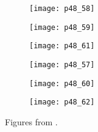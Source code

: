 \begin{figure}[htb]
    \centering %
    \begin{subfigure}{0.25\textwidth}
        \texttt{[image: p48\_58]}
    \end{subfigure}\hfil %
    \begin{subfigure}{0.25\textwidth}
        \texttt{[image: p48\_59]}
    \end{subfigure}\hfil %
    \begin{subfigure}{0.25\textwidth}
        \texttt{[image: p48\_61]}
    \end{subfigure}

    \medskip
    \begin{subfigure}{0.25\textwidth}
        \texttt{[image: p48\_57]}
    \end{subfigure}\hfil %
    \begin{subfigure}{0.25\textwidth}
        \texttt{[image: p48\_60]}
    \end{subfigure}\hfil %
    \begin{subfigure}{0.25\textwidth}
        \texttt{[image: p48\_62]}
    \end{subfigure}
    \caption{Figures from \cite{qi2017pointnet}.}
\end{figure}

